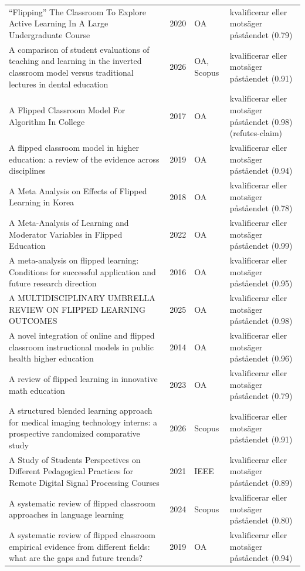 \begin{longtable}{@{}%
  >{\raggedright\arraybackslash}p{}c%
  >{\raggedright\arraybackslash}p{}%
  >{\raggedright\arraybackslash}p{}@{}}
``Flipping'' The Classroom To Explore Active Learning In A Large Undergraduate Course & 2020 & OA & kvalificerar eller motsäger påståendet (0.79) \\
A comparison of student evaluations of teaching and learning in the inverted classroom model versus traditional lectures in dental education & 2026 & OA, Scopus & kvalificerar eller motsäger påståendet (0.91) \\
A Flipped Classroom Model For Algorithm In College & 2017 & OA & kvalificerar eller motsäger påståendet (0.98) (refutes-claim) \\
A flipped classroom model in higher education: a review of the evidence across disciplines & 2019 & OA & kvalificerar eller motsäger påståendet (0.94) \\
A Meta Analysis on Effects of Flipped Learning in Korea & 2018 & OA & kvalificerar eller motsäger påståendet (0.78) \\
A Meta-Analysis of Learning and Moderator Variables in Flipped Education & 2022 & OA & kvalificerar eller motsäger påståendet (0.99) \\
A meta-analysis on flipped learning: Conditions for successful application and future research direction & 2016 & OA & kvalificerar eller motsäger påståendet (0.95) \\
A MULTIDISCIPLINARY UMBRELLA REVIEW ON FLIPPED LEARNING OUTCOMES & 2025 & OA & kvalificerar eller motsäger påståendet (0.98) \\
A novel integration of online and flipped classroom instructional models in public health higher education & 2014 & OA & kvalificerar eller motsäger påståendet (0.96) \\
A review of flipped learning in innovative math education & 2023 & OA & kvalificerar eller motsäger påståendet (0.79) \\
A structured blended learning approach for medical imaging technology interns: a prospective randomized comparative study & 2026 & Scopus & kvalificerar eller motsäger påståendet (0.91) \\
A Study of Students Perspectives on Different Pedagogical Practices for Remote Digital Signal Processing Courses & 2021 & IEEE & kvalificerar eller motsäger påståendet (0.89) \\
A systematic review of flipped classroom approaches in language learning & 2024 & Scopus & kvalificerar eller motsäger påståendet (0.80) \\
A systematic review of flipped classroom empirical evidence from different fields: what are the gaps and future trends? & 2019 & OA & kvalificerar eller motsäger påståendet (0.94) \\

\end{longtable}
